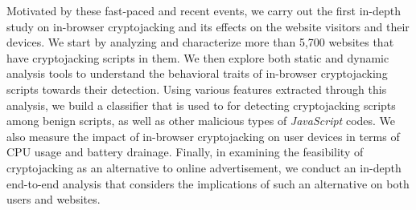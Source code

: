 \documentclass[acmlarge]{acmart}
\newcommand{\js}{{\em JavaScript}\xspace}
\newcommand{\cj}{cryptojacking\xspace}
\begin{document}
Motivated by these fast-paced and recent events, we carry out the first in-depth study on in-browser \cj and its effects on the website visitors and their devices. We start by analyzing and characterize more than 5,700 websites that have \cj scripts in them. We then explore both static and dynamic analysis tools to understand the behavioral traits of in-browser \cj scripts towards their detection. Using various features extracted through this analysis, we build a classifier that is used to for detecting \cj scripts among benign scripts, as well as other malicious types of \js codes. We also measure the impact of in-browser \cj on user devices in terms of CPU usage and battery drainage. Finally, in examining the feasibility of \cj as an alternative to online advertisement, we conduct an in-depth end-to-end analysis that considers the implications of such an alternative on both users and websites.
\end{document}
